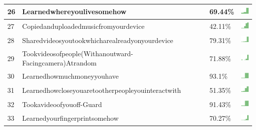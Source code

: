 \documentclass[a4paper,12pt]{article}
\begin{document}
\begin{longtable}{| p{0.5cm} | p{7cm} | p{1cm} | c |}
26 & Learnedwhereyoulivesomehow & 69.44\% & \includegraphics[width = 0.5cm, height = 0.5cm]{learnedwhereyoulivesomehowWORKCONTACTS} \\ \hline 
27 & Copiedanduploadedmusicfromyourdevice & 42.11\% & \includegraphics[width = 0.5cm, height = 0.5cm]{copiedanduploadedmusicfromyourdeviceWORKCONTACTS} \\ \hline 
28 & Sharedvideosyoutookwhicharealreadyonyourdevice & 79.31\% & \includegraphics[width = 0.5cm, height = 0.5cm]{sharedvideosyoutookwhicharealreadyonyourdeviceWORKCONTACTS} \\ \hline 
29 & Tookvideosofpeople(Withanoutward-Facingcamera)Atrandom & 71.88\% & \includegraphics[width = 0.5cm, height = 0.5cm]{tookvideosofpeople(withanoutward-facingcamera)atrandomWORKCONTACTS} \\ \hline 
30 & Learnedhowmuchmoneyyouhave & 93.1\% & \includegraphics[width = 0.5cm, height = 0.5cm]{learnedhowmuchmoneyyouhaveWORKCONTACTS} \\ \hline 
31 & Learnedhowcloseyouaretootherpeopleyouinteractwith & 51.35\% & \includegraphics[width = 0.5cm, height = 0.5cm]{learnedhowcloseyouaretootherpeopleyouinteractwithWORKCONTACTS} \\ \hline 
32 & Tookavideoofyouoff-Guard & 91.43\% & \includegraphics[width = 0.5cm, height = 0.5cm]{tookavideoofyouoff-guardWORKCONTACTS} \\ \hline 
33 & Learnedyourfingerprintsomehow & 70.27\% & \includegraphics[width = 0.5cm, height = 0.5cm]{learnedyourfingerprintsomehowWORKCONTACTS} \\ \hline 

\end{longtable}
\end{document}

